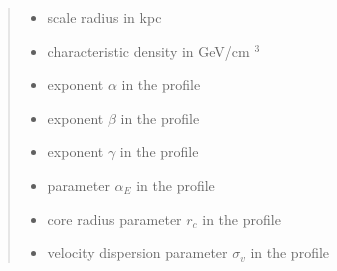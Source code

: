\documentclass[letterpaper,10pt,english]{sphinxmanual}
\begin{document}
\begin{fulllineitems}
\begin{itemize}
\end{itemize}
\begin{quote}\begin{description}
\begin{itemize}
\item {} 
\sphinxAtStartPar
{} \textendash{} scale radius in kpc

\item {} 
\sphinxAtStartPar
{} \textendash{} characteristic density in GeV/cm \({}^3\)

\item {} 
\sphinxAtStartPar
{} \textendash{} exponent \(\alpha\) in the {\hyperref[\detokenize{diffsph.profiles:diffsph.profiles.templates.hdz}]{}} profile

\item {} 
\sphinxAtStartPar
{} \textendash{} exponent \(\beta\) in the {\hyperref[\detokenize{diffsph.profiles:diffsph.profiles.templates.hdz}]{}} profile

\item {} 
\sphinxAtStartPar
{} \textendash{} exponent \(\gamma\) in the {\hyperref[\detokenize{diffsph.profiles:diffsph.profiles.templates.hdz}]{}} profile

\item {} 
\sphinxAtStartPar
{} \textendash{} parameter \(\alpha_E\) in the {\hyperref[\detokenize{diffsph.profiles:diffsph.profiles.templates.enst}]{}} profile

\item {} 
\sphinxAtStartPar
{} \textendash{} core radius parameter \(r_c\) in the {\hyperref[\detokenize{diffsph.profiles:diffsph.profiles.templates.cnfw}]{}} profile

\item {} 
\sphinxAtStartPar
{} \textendash{} velocity dispersion parameter \(\sigma_v\) in the {\hyperref[\detokenize{diffsph.profiles:diffsph.profiles.templates.sis}]{}} profile


\end{itemize}
\end{description}
\end{quote}
\end{fulllineitems}
\end{document}
